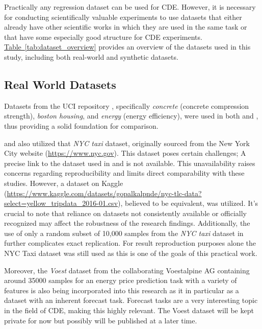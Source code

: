 \documentclass{article}
\newcommand\tef[1]{\hyperref[#1]{Table~\ref{#1}}}
\begin{document}
Practically any regression dataset can be used for CDE. However, it is necessary for conducting scientifically valuable experiments to use datasets that either already have other scientific works in which they are used in the same task or that have some especially good structure for CDE experiments. \tef{tab:dataset_overview} provides an overview of the datasets used in this study, including both real-world and synthetic datasets.

\subsection{Real World Datasets}
Datasets from the UCI repository \citep{dua2019uci}, specifically \textit{concrete} (concrete compression strength), \textit{boston housing}, and \textit{energy} (energy efficiency), were used in both \citep{rothfuss2019noise} and \citep{trippe2018conditional}, thus providing a solid foundation for comparison.

\citep{rothfuss2019noise} and \citep{trippe2018conditional} also utilized that \textit{NYC taxi} dataset, originally sourced from the New York City website (\url{https://www.nyc.gov}). This dataset poses certain challenges; A precise link to the dataset used in \citep{rothfuss2019noise} and \citep{trippe2018conditional} is not available. This unavailability raises concerns regarding reproducibility and limits direct comparability with these studies. However, a dataset on Kaggle (\url{https://www.kaggle.com/datasets/gopalkalpnde/nyc-tlc-data?select=yellow\_tripdata\_2016-01.csv}), believed to be equivalent, was utilized. It's crucial to note that reliance on datasets not consistently available or officially recognized may affect the robustness of the research findings. Additionally, the use of only a random subset of 10,000 samples from the \textit{NYC taxi} dataset in \citep{rothfuss2019noise} further complicates exact replication. For result reproduction purposes alone the NYC Taxi dataset was still used as this is one of the goals of this practical work.

Moreover, the \textit{Voest} dataset from the collaborating Voestalpine AG containing around 35000 samples for an energy price prediction task with a variety of features is also being incorporated into this research as it in particular as a dataset with an inherent forecast task. Forecast tasks are a very interesting topic in the field of CDE, making this highly relevant. The Voest dataset will be kept private for now but possibly will be published at a later time.
\end{document}

